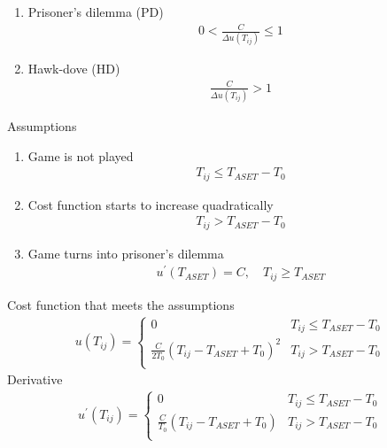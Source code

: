 \vspace{1.0cm}

\begin{enumerate}[label=\roman{enumi})]
\item Prisoner's dilemma (PD)
\begin{align}
0 < \frac{C}{\Delta u(T_{ij})} \leq 1
\end{align}

\item Hawk-dove (HD)
\begin{align}
\frac{C}{\Delta u(T_{ij})} > 1
\end{align}

\end{enumerate}

Assumptions
\begin{enumerate}
\item Game is not played
\begin{align}
T_{ij} \leq T_{ASET} - T_{0}
\end{align}

\item Cost function starts to increase quadratically
\begin{align}
T_{ij} > T_{ASET} - T_{0}
\end{align}

\item Game turns into prisoner's dilemma
\begin{align}
u^{\prime}(T_{ASET}) = C, \quad T_{ij} \geq T_{ASET}
\end{align}

\end{enumerate}

Cost function that meets the assumptions
\begin{align}
u(T_{ij}) = \begin{cases}
0 & T_{ij} \leq T_{ASET} - T_{0} \\
\frac{C}{2 T_{0}} \left(T_{ij} - T_{ASET} + T_{0}\right)^{2} & T_{ij} > T_{ASET} - T_{0} \\
\end{cases}
\end{align}
Derivative
\begin{align}
u^{\prime}(T_{ij}) = \begin{cases}
0 & T_{ij} \leq T_{ASET} - T_{0} \\
\frac{C}{T_{0}} \left(T_{ij} - T_{ASET} + T_{0}\right) & T_{ij} > T_{ASET} - T_{0} \\
\end{cases}
\end{align}

